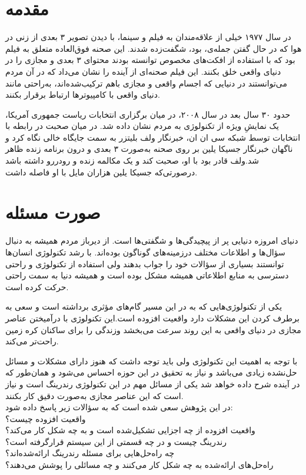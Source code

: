 \section{مقدمه}
در سال ۱۹۷۷ خیلی از علاقه‌مندان به فیلم و سینما، با دیدن تصویر ۳ بعدی از زنی در هوا که در حال گفتن جمله‌ی،   بود، شگفت‌زده شدند. این صحنه فوق‌العاده متعلق به فیلم \lr{جنگ ستارگام]} بود که با استفاده از افکت‌های مخصوص توانسته بودند محتوای ۳ بعدی و مجازی را در دنیای واقعی خلق بکنند. این فیلم صحنه‌ای از آینده را نشان می‌داد که در آن مردم می‌توانستند در دنیایی که اجسام واقعی و مجازی باهم ترکیب‌شده‌اند، به‌راحتی مانند دنیای واقعی با کامپیوترها ارتباط برقرار بکنند.

حدود ۳۰ سال بعد در سال ۲۰۰۸، در میان برگزاری انتخابات ریاست جمهوری آمریکا، یک نمایشِ ویژه از تکنولوژی به مردم نشان داده شد. در میان صحبت در رابطه با انتخابات توسط شبکه سی ان ان، خبرنگار ولف بلیتزر به سمت جایگاه خالی نگاه کرد و ناگهان خبرنگار جسیکا یلین  بر روی صحنه به‌صورت ۳ بعدی و درون برنامه زنده ظاهر شد.ولف قادر بود با او، صحبت کند و یک مکالمه زنده و رودررو داشته باشد درصورتی‌که جسیکا یلین هزاران مایل با او فاصله داشت.
\section{صورت مسئله}
دنیای امروزه دنیایی پر از پیچیدگی‌ها و شگفتی‌ها است. از دیرباز مردم همیشه به دنبال سؤال‌ها و اطلاعات مختلف درزمینه‌های گوناگون بوده‌اند.
با رشد تکنولوژی انسان‌ها توانستند بسیاری از سؤالات خود را جواب بدهند ولی استفاده از تکنولوژی و راحتی دسترسی به منابع اطلاعاتی همیشه مشکل بوده است و همیشه دنیا به سمت راحتی حرکت کرده است.

یکی از تکنولوژی‌هایی که به در این مسیر گام‌های مؤثری برداشته است و سعی به برطرف کردن این مشکلات دارد واقعیت افزوده است.این تکنولوژی با درآمیختن عناصر مجازی در دنیای واقعی به این روند سرعت می‌بخشد وزندگی را برای ساکنان کره زمین راحت‌تر می‌کند.

با توجه به اهمیت این تکنولوژی ولی باید توجه داشت که هنوز دارای مشکلات و مسائل حل‌نشده زیادی می‌باشد و نیاز به تحقیق در این حوزه احساس می‌شود و همان‌طور که در آینده شرح داده خواهد شد یکی از مسائل مهم در این تکنولوژی رندرینگ است و نیاز است که این عناصر مجازی به‌صورت دقیق کار بکنند.
\\
در این پژوهش سعی شده است که به سؤالات زیر پاسخ داده شود:
\\
واقعیت افزوده چیست؟
\\
واقعیت افزوده از چه اجزایی تشکیل‌شده است و به چه شکل کار می‌کند؟
\\
رندرینگ چیست و در چه قسمتی از این سیستم قرارگرفته است؟
\\
چه راه‌حل‌هایی برای مسئله رندرینگ ارائه‌شده‌اند؟
\\
راه‌حل‌های ارائه‌شده به چه شکل کار می‌کنند و چه مسائلی را پوشش می‌دهند؟



